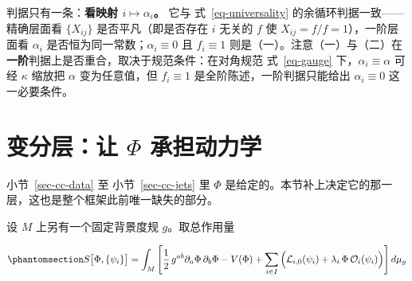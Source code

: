 \documentclass[
  chinese,
  a4paper,
  UTF8,
  12pt,
  oneside,
  openany]{ctexbook}
\theoremstyle{plain}
\theoremstyle{plain}
\theoremstyle{plain}
\theoremstyle{definition}
\theoremstyle{plain}
\theoremstyle{plain}
\theoremstyle{remark}
\begin{document}
判据只有一条：\textbf{看映射 \(i\mapsto\alpha_i\)。} 它与
式~\ref{eq-universality} 的余循环判据一致------精确层面看 \(\{X_{ij}\}\)
是否平凡（即是否存在 \(i\) 无关的 \(f\) 使
\(X_{ij}=f/f=1\)），一阶层面看 \(\alpha_i\)
是否恒为同一常数；\(\alpha_i\equiv0\) 且 \(f_i\equiv1\)
则是（一）。注意（一）与（二）在\textbf{一阶}判据上是否重合，取决于规范条件：在对角规范
式~\ref{eq-gauge} 下，\(\alpha_i\equiv\alpha\) 可经 \(\kappa\) 缩放把
\(\alpha\) 变为任意值，但 \(f_i\equiv1\) 是全阶陈述，一阶判据只能给出
\(\alpha_i\equiv0\) 这一必要条件。

\section{\texorpdfstring{变分层：让 \(\Phi\)
承担动力学}{变分层：让 \textbackslash Phi 承担动力学}}\label{sec-cc-field}

小节~\ref{sec-cc-data} 至 小节~\ref{sec-cc-jets} 里 \(\Phi\)
是给定的。本节补上决定它的那一层，这也是整个框架此前唯一缺失的部分。

设 \(M\) 上另有一个固定背景度规 \(g\)。取总作用量

\begin{equation}\protect\phantomsection\label{eq-action}{
S\big[\Phi,\{\psi_i\}\big]
=
\int_{M}
\left[
\frac{1}{2}\,g^{ab}\partial_{a}\Phi\,\partial_{b}\Phi - V(\Phi)
+ \sum_{i\in I}\Big(\mathcal{L}_{i,0}(\psi_i) + \lambda_i\,\Phi\,\mathcal{O}_i(\psi_i)\Big)
\right] d\mu_g
}\end{equation}
\end{document}
